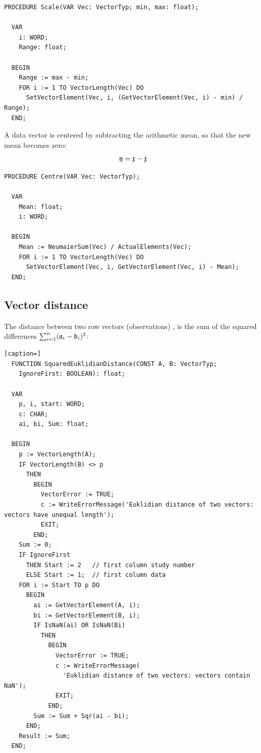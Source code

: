 \begin{refsection}
\begin{lstlisting}[caption=Scaling a vector]
  PROCEDURE Scale(VAR Vec: VectorTyp; min, max: float);

  VAR
    i: WORD;
    Range: float;

  BEGIN
    Range := max - min;
    FOR i := 1 TO VectorLength(Vec) DO
      SetVectorElement(Vec, i, (GetVectorElement(Vec, i) - min) / Range);
  END;
\end{lstlisting}

A data vector is centered by subtracting the arithmetic mean, so that the new mean becomes zero:
\begin{equation}
  \mathfrak{y} = \mathfrak{x} - \bar{\mathfrak{x}}
\end{equation}


\begin{lstlisting}[caption=Centering a vector]
  PROCEDURE Centre(VAR Vec: VectorTyp);

  VAR
    Mean: float;
    i: WORD;

  BEGIN
    Mean := NeumaierSum(Vec) / ActualElements(Vec);
    FOR i := 1 TO VectorLength(Vec) DO
      SetVectorElement(Vec, i, GetVectorElement(Vec, i) - Mean);
  END;
\end{lstlisting}

\subsection{Vector distance}

The distance between two row vectors (observations) ,  is the sum of the squared differences \( \sum_{i=1}^n(\mathfrak{a}_i - \mathfrak{b}_i)^2 \):

\begin{lstlisting}[caption=]
  FUNCTION SquaredEuklidianDistance(CONST A, B: VectorTyp;
    IgnoreFirst: BOOLEAN): float;

  VAR
    p, i, start: WORD;
    c: CHAR;
    ai, bi, Sum: float;

  BEGIN
    p := VectorLength(A);
    IF VectorLength(B) <> p
      THEN
        BEGIN
          VectorError := TRUE;
          c := WriteErrorMessage('Euklidian distance of two vectors: vectors have unequal length');
          EXIT;
        END;
    Sum := 0;
    IF IgnoreFirst
      THEN Start := 2   // first column study number
      ELSE Start := 1;  // first column data
    FOR i := Start TO p DO
      BEGIN
        ai := GetVectorElement(A, i);
        bi := GetVectorElement(B, i);
        IF IsNaN(ai) OR IsNaN(Bi)
          THEN
            BEGIN
              VectorError := TRUE;
              c := WriteErrorMessage(
                'Euklidian distance of two vectors: vectors contain NaN');
              EXIT;
            END;
        Sum := Sum + Sqr(ai - bi);
      END;
    Result := Sum;
  END;
\end{lstlisting}




\end{refsection}
